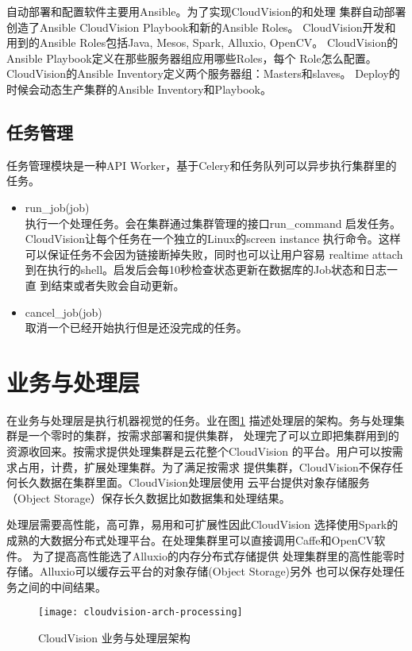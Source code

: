 自动部署和配置软件主要用Ansible。为了实现CloudVision的和处理
集群自动部署创造了Ansible CloudVision Playbook和新的Ansible Roles。
CloudVision开发和用到的Ansible Roles包括Java, Mesos, Spark, Alluxio, OpenCV。
CloudVision的Ansible Playbook定义在那些服务器组应用哪些Roles，每个
Role怎么配置。CloudVision的Ansible Inventory定义两个服务器组：Masters和slaves。
Deploy的时候会动态生产集群的Ansible Inventory和Playbook。

\subsection{任务管理}
任务管理模块是一种API Worker，基于Celery和任务队列可以异步执行集群里的任务。
\begin{itemize}
  \item run\_job(job) \\
        执行一个处理任务。会在集群通过集群管理的接口run\_command
        启发任务。CloudVision让每个任务在一个独立的Linux的screen instance
        执行命令。这样可以保证任务不会因为链接断掉失败，同时也可以让用户容易
        realtime attach到在执行的shell。启发后会每10秒检查状态更新在数据库的Job状态和日志一直
        到结束或者失败会自动更新。
  \item cancel\_job(job) \\
        取消一个已经开始执行但是还没完成的任务。
\end{itemize}

\section{业务与处理层}
\label{sec:arch_processing}
在业务与处理层是执行机器视觉的任务。业在图\ref{fig:cloudvision-arch-processing}
描述处理层的架构。务与处理集群是一个零时的集群，按需求部署和提供集群，
处理完了可以立即把集群用到的资源收回来。按需求提供处理集群是云花整个CloudVision
的平台。\cite{nistcloud}用户可以按需求占用，计费，扩展处理集群。为了满足按需求
提供集群，CloudVision不保存任何长久数据在集群里面。CloudVision处理层使用
云平台提供对象存储服务（Object Storage）保存长久数据比如数据集和处理结果。

处理层需要高性能，高可靠，易用和可扩展性因此CloudVision
选择使用Spark的成熟的大数据分布式处理平台。在处理集群里可以直接调用Caffe和OpenCV软件。
为了提高高性能选了Alluxio的内存分布式存储提供
处理集群里的高性能零时存储。Alluxio可以缓存云平台的对象存储(Object Storage)另外
也可以保存处理任务之间的中间结果。
\begin{figure}[h]
  \centering
    \texttt{[image: cloudvision-arch-processing]}
  \caption{CloudVision 业务与处理层架构}
  \label{fig:cloudvision-arch-processing}
\end{figure}

